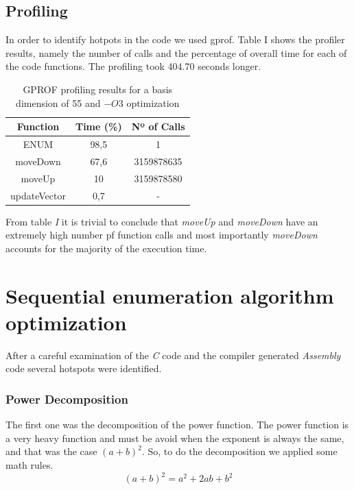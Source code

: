 \documentclass[conference]{IEEEtran}
\begin{document}
\subsection{Profiling}
In order to identify hotpots in the code we used gprof. Table I shows the profiler results, namely the number of calls and the percentage of overall time for each of the code functions.
The profiling took 404.70 seconds longer.

\begin{table}[ht!]
\centering
\label{my-label}

\begin{tabular}{|c|c|c|}
\hline
\rowcolor[HTML]{C0C0C0} 
{\color[HTML]{000000} Function} & {\color[HTML]{000000} Time (\%)} & {\color[HTML]{000000} Nº of Calls} \\ \hline
ENUM                            & 98,5                             & 1                                  \\ \hline
moveDown                        & 67,6                             & 3159878635                         \\ \hline
moveUp                          & 10                               & 3159878580                         \\ \hline
updateVector                    & 0,7                              & -                                  \\ \hline
\end{tabular}
\caption{GPROF profiling results for a basis dimension of 55 and $-O3$ optimization}
\end{table}

From table \emph{I} it is trivial to conclude that \emph{moveUp} and \emph{moveDown} have an extremely high number pf function calls and most importantly \emph{moveDown} accounts for the majority of the execution time.

\section{Sequential enumeration algorithm optimization}
After a careful examination of the \emph{C} code and the compiler generated \emph{Assembly} code several hotspots were identified. 

\subsubsection{Power Decomposition}
The first one was the decomposition of the power function. The power function is a very heavy function and must be avoid when the exponent is always the same, and that was the case $(a + b)^2$. So, to do the decomposition we applied some math rules.
\begin{equation}
(a + b)^2 = a^2 + 2ab + b^2
\end{equation}
\end{document}
